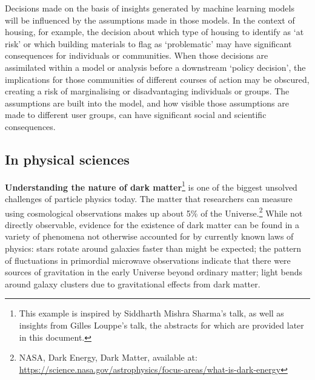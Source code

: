 {Decisions made on the basis of insights generated by machine learning
models will be influenced by the assumptions made in those models. In
the context of housing, for example, the decision about which type of
housing to identify as `at risk' or which building materials to flag as
`problematic' may have significant consequences for individuals or
communities. When those decisions are assimilated within a model or
analysis before a downstream `policy decision', the implications for
those communities of different courses of action may be obscured,
creating a risk of marginalising or disadvantaging individuals or
groups. The assumptions are built into the model, and how visible those
assumptions are made to different user groups, can have significant
social and scientific consequences.

\hypertarget{in-physical-sciences}{%
\subsection{In physical sciences}\label{in-physical-sciences}}

\textbf{Understanding the nature of dark matter}\footnote{This example
  is inspired by Siddharth Mishra Sharma's talk, as well as insights
  from Gilles Louppe's talk, the abstracts for which are provided later
  in this document.} is one of the biggest unsolved challenges of
particle physics today. The matter that researchers can measure using
cosmological observations makes up about 5\% of the Universe.\footnote{NASA,
  Dark Energy, Dark Matter, available at:
  \href{https://science.nasa.gov/astrophysics/focus-areas/what-is-dark-energy}{\uline{https://science.nasa.gov/astrophysics/focus-areas/what-is-dark-energy}}}
While not directly observable, evidence for the existence of dark matter
can be found in a variety of phenomena not otherwise accounted for by
currently known laws of physics: stars rotate around galaxies faster
than might be expected; the pattern of fluctuations in primordial
microwave observations indicate that there were sources of gravitation
in the early Universe beyond ordinary matter; light bends around galaxy
clusters due to gravitational effects from dark matter.~

}
